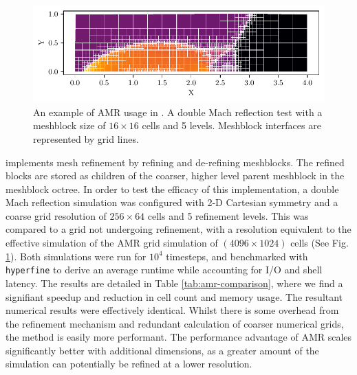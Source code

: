 \begin{figure}[ht]
  \centering
  \includegraphics{assets/refinement/dmach/plot.pdf}
  \caption[\athena{} adaptive mesh refinement example]{An example of AMR usage in \athena. A double Mach reflection test with a meshblock size of $16 \times 16$ cells and 5 levels. Meshblock interfaces are represented by grid lines.}
  \label{fig:athena-amr-example}
\end{figure}

\athena{} implements mesh refinement by refining and de-refining meshblocks.
The refined blocks are stored as children of the coarser, higher level parent meshblock in the meshblock octree.
In order to test the efficacy of this implementation, a double Mach reflection simulation was configured with 2-D Cartesian symmetry and a coarse grid resolution of $256\times 64$ cells and 5 refinement levels.
This was compared to a grid not undergoing refinement, with a resolution equivalent to the effective simulation of the AMR grid simulation of $(4096\times 1024)$ cells (See Fig. \ref{fig:athena-amr-example}).
Both simulations were run for $10^4$ timesteps, and benchmarked with \texttt{hyperfine} to derive an average runtime while accounting for I/O and shell latency.
The results are detailed in Table \ref{tab:amr-comparison}, where we find a signifiant speedup and reduction in cell count and memory usage.
The resultant numerical results were effectively identical.
Whilst there is some overhead from the refinement mechanism and redundant calculation of coarser numerical grids, the method is easily more performant.
The performance advantage of AMR scales significantly better with additional dimensions, as a greater amount of the simulation can potentially be refined at a lower resolution.

